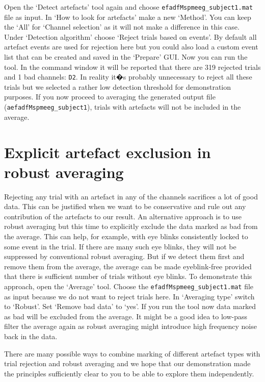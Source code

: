 Open the `Detect artefacts' tool again and choose \texttt{efadfMspmeeg\_subject1.mat} file as input. In `How to look for artefacts' make a new `Method'. You can keep the `All' for `Channel selection' as it will not make a difference in this case. Under `Detection algorithm' choose `Reject trials based on events'. By default all artefact events are used for rejection here but you could also load a custom event list that can be created and saved in the `Prepare' GUI. Now you can run the tool. In the command window it will be reported that there are 319 rejected trials and 1 bad channels: \texttt{D2}. In reality it�s probably unnecessary to reject all these trials but we selected a rather low detection threshold for demonstration purposes. If you now proceed to averaging the generated output file (\texttt{aefadfMspmeeg\_subject1}), trials with artefacts will not be included in the average. 

\section{Explicit artefact exclusion in robust averaging}

Rejecting any trial with an artefact in any of the channels sacrifices a lot of good data.  This can be justified when we want to be conservative and rule out any contribution of the artefacts to our result. An alternative approach is to use robust averaging but this time to explicitly exclude the data marked as bad from the average. This can help, for example, with eye blinks consistently locked to some event in the trial. If there are many such eye blinks, they will not be suppressed by conventional robust averaging. But if we detect them first and remove them from the average, the average can be made eyeblink-free provided that there is sufficient number of trials without eye blinks. To demonstrate this approach, open the `Average' tool. Choose the \texttt{efadfMspmeeg\_subject1.mat} file as input because we do not want to reject trials here. In `Averaging type' switch to `Robust'.  Set `Remove bad data' to `yes'. If you run the tool now data marked as bad will be excluded from the average. It might be a good idea to low-pass filter the average again as robust averaging might introduce high frequency noise back in the data. 

There are many possible ways to combine marking of different artefact types with trial rejection and robust averaging and we hope that our demonstration made the principles sufficiently clear to you to be able to explore them independently. 



